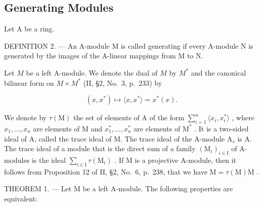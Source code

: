 \subsection{Generating Modules}

Let \(\mathrm{A}\) be a ring.

DEFINITION 2. --- An A-module M is called generating if every A-module N is generated by the images of the A-linear mappings from M to N.

Let \(M\) be a left A-module. We denote the dual of \(M\) by \(M^*\) and the canonical bilinear form on \(M \times M^*\) (II, §2, No.~3, p.~233) by

\[
(x, x ^ {*}) \mapsto \langle x, x ^ {*} \rangle = x ^ {*} (x).
\]

We denote by \(\tau(\mathrm{M})\) the set of elements of A of the form \(\sum_{i=1}^{n}\langle x_i,x_i^*\rangle\) , where \(x_1,\ldots ,x_n\) are elements of M and \(x_1^*,\ldots ,x_n^*\) are elements of \(\mathrm{M}^*\) . It is a two-sided ideal of A, called the trace ideal of M. The trace ideal of the A-module \(\mathrm{A}_s\) is A. The trace ideal of a module that is the direct sum of a family \((\mathrm{M}_i)_{i\in \mathrm{I}}\) of A-modules is the ideal \(\sum_{i\in \mathrm{I}}\tau(\mathrm{M}_i)\) . If M is a projective A-module, then it follows from Proposition 12 of II, §2, No.~6, p.~238, that we have \(\mathrm{M} = \tau(\mathrm{M})\mathrm{M}\) .

THEOREM 1. --- Let M be a left A-module. The following properties are equivalent:

